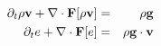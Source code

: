 \begin{eqnarray*}
\partial_t \rho{\bf v} + \nabla\cdot {\bf F}[\rho{\bf v}]&=&\rho{\bf g} \\
\partial_t e + \nabla\cdot {\bf F}[e]&=&\rho{\bf g}\cdot{\bf v} 
\end{eqnarray*}
